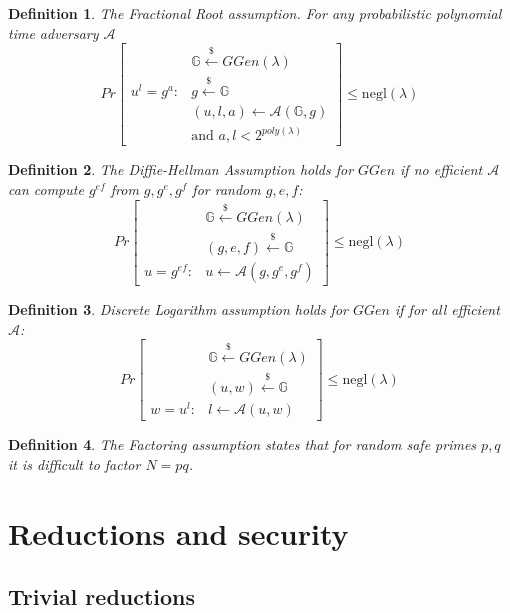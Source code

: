 \documentclass[a4paper]{article}
\newtheorem{definition}{Definition}
\begin{document}
\begin{definition}
The \emph{Fractional Root assumption}. For any probabilistic polynomial time adversary $\mathcal{A}$ 
$$
Pr
\begin{bmatrix}
&\mathbb{G}\xleftarrow{\$}GGen(\lambda)\\
u^l = g^{a} : & g \xleftarrow{\$}\mathbb{G}\\
& (u,l,a) \xleftarrow{} \mathcal{A}(\mathbb{G},g)\\
& \text{and }a,l<2^{poly(\lambda)}
\end{bmatrix}\leq \mathrm{negl}(\lambda)
$$

\end{definition}

\begin{definition}
The \emph{Diffie-Hellman Assumption} holds for
$GGen$ if no efficient $\mathcal{A}$ can compute $g^{ef}$ from $g,g^e,g^f$ for random $g,e,f$:
$$
Pr
\begin{bmatrix}
&\mathbb{G}\xleftarrow{\$}GGen(\lambda)\\
& (g,e,f)\xleftarrow{\$}\mathbb{G}\\
u = g^{ef} :& u \xleftarrow{} \mathcal{A}(g,g^e,g^f)
\end{bmatrix}\leq \mathrm{negl}(\lambda)
$$
\end{definition}

\begin{definition}
\emph{Discrete Logarithm} assumption 
holds for
$GGen$ if for all efficient $\mathcal{A}$:
$$
Pr
\begin{bmatrix}
&\mathbb{G}\xleftarrow{\$}GGen(\lambda)\\
& (u,w)\xleftarrow{\$}\mathbb{G}\\
w = u^l :& l \xleftarrow{} \mathcal{A}(u,w)
\end{bmatrix}\leq \mathrm{negl}(\lambda)
$$
\end{definition}

\begin{definition}
The \emph{Factoring} assumption states that for random safe primes $p,q$ it is difficult to factor $N=pq$.
\end{definition}


\section{Reductions and security}

\subsection{Trivial reductions}
\end{document}
